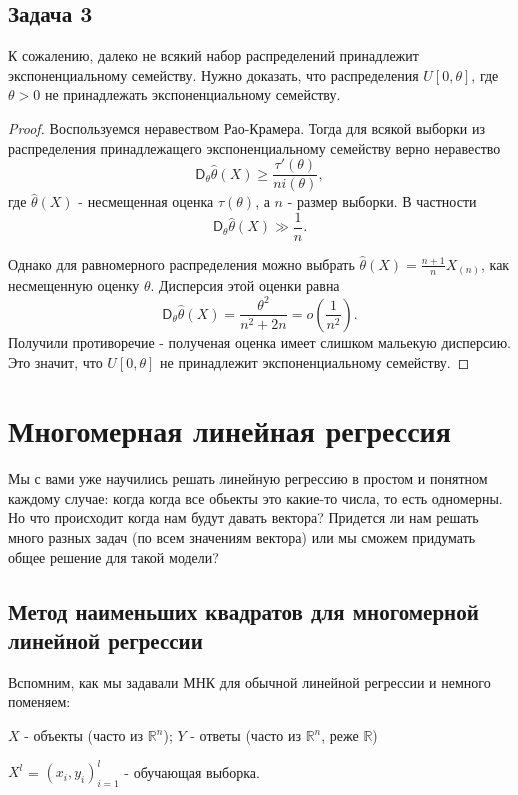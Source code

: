 \subsection*{Задача 3}

К сожалению, далеко не всякий набор распределений принадлежит экспоненциальному семейству. Нужно доказать, что распределения
$U[0, \theta]$, где $\theta > 0$ не принадлежать экспоненциальному семейству.

\begin{proof}
  Воспользуемся неравеством Рао-Крамера. Тогда для всякой выборки из распределения принадлежащего экспоненциальному семейству верно неравество
  $$
  \mathsf{D}_\theta \widehat\theta(X) \geq \frac{\tau'(\theta)}{ni(\theta)},
  $$
  где $\widehat\theta(X)$ - несмещенная оценка $\tau(\theta)$, а $n$ - размер выборки.
  В частности
  $$\mathsf{D}_\theta \widehat\theta(X) \gg \frac{1}{n}.$$
  
  Однако для равномерного распределения можно выбрать $\widehat\theta(X) = \frac{n+1}{n} X_{(n)}$, как несмещенную оценку $\theta$. Дисперсия этой оценки равна
  $$
  \mathsf{D}_\theta \widehat\theta(X) = \frac{\theta^2}{n^2 + 2n} = o\left(\frac{1}{n^2}\right).
  $$
  Получили противоречие - полученая оценка имеет слишком мальекую дисперсию. Это значит, что $U[0, \theta]$ не принадлежит экспоненциальному семейству.
\end{proof}

\section*{Многомерная линейная регрессия}
Мы с вами уже научились решать линейную регрессию в простом и понятном каждому случае: когда когда все обьекты это какие-то числа, то есть одномерны. Но что происходит когда нам будут давать вектора? Придется ли нам решать много разных задач (по всем значениям вектора) или мы сможем придумать общее решение для такой модели?

 
\subsection*{Метод наименьших квадратов для многомерной линейной регрессии}
Вспомним, как мы задавали МНК для обычной линейной регрессии и немного поменяем:

$X$ - объекты (часто из $\mathbb{R}^n$); $Y$ - ответы (часто из $\mathbb{R}^n$, реже $\mathbb{R}$)

$X^{l}$ = $(x_i, y_i)^l_{i = 1}$ - обучающая выборка.

